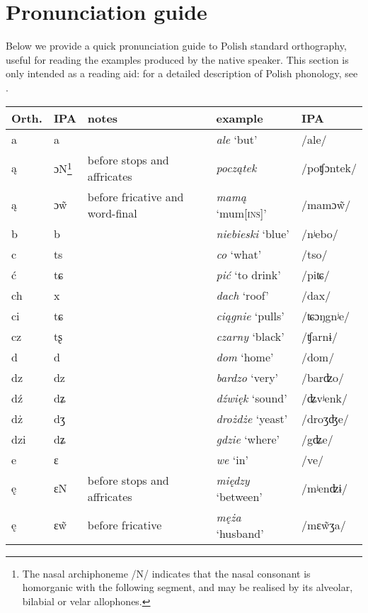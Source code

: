 \chapter{Pronunciation guide}\label{sec:9}
Below we provide a quick pronunciation guide to Polish standard orthography, useful for reading the examples produced by the native speaker. This section is only intended as a reading aid: for a detailed description of Polish phonology, see \citet{Gussman2007}.

{\centering
\footnotesize
    \begin{tabular}{lllll}
        \lsptoprule
        Orth. & IPA & notes & example & IPA\\
        \midrule
        a & a &  & \textit{ale} `but' & /ale/\\
        ą & ɔN\footnote{The nasal archiphoneme /N/ indicates that the nasal consonant is homorganic with the following segment, and may be realised by its alveolar, bilabial or velar allophones.} & before stops  and affricates & \textit{początek} & /poʧɔntek/\\
        ą & ɔ\~{w} & before fricative and word-final & \textit{mamą} `mum\textsc{[ins]}' & /mamɔ\~{w}/\\
        b & b &  & \textit{niebieski} `blue' & /nʲebo/\\
        c & ts &  & \textit{co} `what' & /tso/\\
        ć & tɕ &  & \textit{pić} `to drink' & /piʨ/\\
        ch & x &  & \textit{dach} `roof' & /dax/\\
        ci & tɕ &  & \textit{ciągnie} `pulls' & /ʨɔŋgnʲe/\\
        cz & tʂ &  & \textit{czarny} `black' & /ʧarnɨ/\\
        d & d &  & \textit{dom} `home' & /dom/\\
        dz & dz &  & \textit{bardzo} `very' & /barʣo/\\
        dź & dʑ &  & \textit{dźwięk} `sound' & /ʥvʲenk/\\
        dż & dʒ &  & \textit{drożdże} `yeast' & /droʒʤe/\\
        dzi & dʑ &  & \textit{gdzie} `where' & /gʥe/\\
        e & ɛ &  & \textit{we} `in' & /ve/\\
        ę & ɛN & before stops and affricates & \textit{między} `between' & /mʲenʣɨ/\\
        ę & ɛ\~{w} & before fricative & \textit{męża} `husband' & /mɛ\~{w}ʒa/\\

\end{tabular}}
